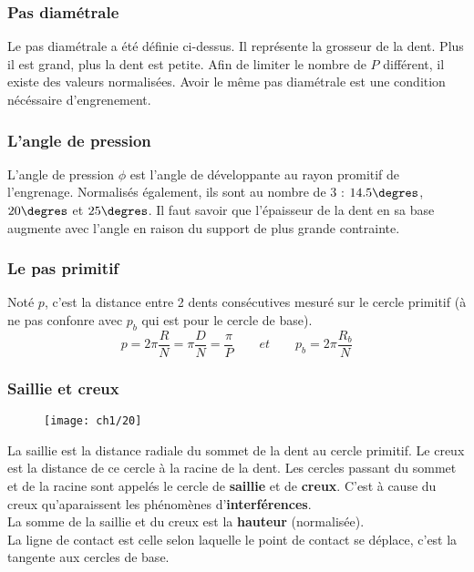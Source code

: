 	\subsubsection{Pas diamétrale}
		Le pas diamétrale a été définie ci-dessus. Il représente la grosseur de la dent. Plus il est grand, plus la dent est petite. Afin de limiter le nombre de $P$ différent, il existe des valeurs normalisées. Avoir le même pas diamétrale est une condition nécéssaire d'engrenement. 
		
	\subsubsection{L'angle de pression}		
		L'angle de pression $\phi$ est l'angle de développante au rayon promitif de l'engrenage. Normalisés également, ils sont au nombre de 3 : $14.5\degres$, $20\degres$ et $25\degres$. Il faut savoir que l'épaisseur de la dent en sa base augmente avec l'angle en raison du support de plus grande contrainte. 
		
	\subsubsection{Le pas primitif}
		Noté $p$, c'est la distance entre 2 dents consécutives mesuré sur le cercle primitif (à ne pas confonre avec $p_b$ qui est pour le cercle de base). 
		\begin{equation}
			p = 2\pi \frac{R}{N} = \pi \frac{D}{N} = \frac{\pi}{P} \qquad et \qquad p_b = 2\pi \frac{R_b}{N}
			\label{eq:1.13}
		\end{equation}
		
	\subsubsection{Saillie et creux}
		\begin{wrapfigure}[7]{l}{5.5cm}
		\vspace{-5mm}
		\texttt{[image: ch1/20]}
		\end{wrapfigure}		
		La saillie est la distance radiale du sommet de la dent au cercle primitif. Le creux est la distance de ce cercle à la racine de la dent. Les cercles passant du sommet et de la racine sont appelés le cercle de \textbf{saillie} et de \textbf{creux}. C'est à cause du creux qu'aparaissent les phénomènes d'\textbf{interférences}. \\
		La somme de la saillie et du creux est la \textbf{hauteur} (normalisée). \\
		La ligne de contact est celle selon laquelle le point de contact se déplace, c'est la tangente aux cercles de base. 
		
